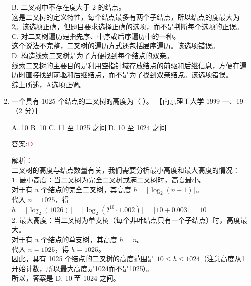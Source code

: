 \documentclass[lang=cn,newtx,10pt,scheme=chinese]{../../../elegantbook}
\begin{document}
\begin{enumerate}
    B. 二叉树中不存在度大于 2 的结点。\\
    这是二叉树的定义特性，每个结点最多有两个子结点，所以结点的度最大为 2。该选项正确，但题目要求选择正确的选项，而不是判断每个选项的正误。\\
    
    C. 对二叉树遍历是指先序、中序或后序遍历中的一种。\\
    这个说法不完整，二叉树的遍历方式还包括层序遍历。该选项错误。\\
    
    D. 构造线索二叉树是为了方便找到每个结点的双亲。\\
    线索二叉树的主要目的是利用空指针域存放结点的前驱和后继信息，方便在遍历时直接找到前驱和后继结点，而不是为了找到双亲结点。该选项错误。\\
    
    综上所述，A选项正确。\\

    \item 一个具有 1025 个结点的二叉树的高度为（ ）。  
    【南京理工大学 1999 一、19（2 分）】  

    A. 10 \quad B. 10 \quad C. 11 至 1025 之间 \quad D. 10 至 1024 之间  

    答案:\textcolor{red}{D}
    
    解析：\\
    二叉树的高度与结点数量有关，我们需要分析最小高度和最大高度的情况：\\
    
    1. 最小高度：当二叉树为完全二叉树或满二叉树时，高度最小。\\
    对于有 $n$ 个结点的完全二叉树，其高度 $h = \lceil \log_2(n+1) \rceil$。\\
    代入 $n = 1025$，得 $h = \lceil \log_2(1026) \rceil = \lceil \log_2(2^{10} \cdot 1.002) \rceil = \lceil 10 + 0.003 \rceil = 10$\\
    
    2. 最大高度：当二叉树为单支树（每个非叶结点只有一个子结点）时，高度最大。\\
    对于有 $n$ 个结点的单支树，其高度 $h = n$。\\
    代入 $n = 1025$，得 $h = 1025$。\\
    
    因此，具有 1025 个结点的二叉树的高度范围是 $10 \leq h \leq 1024$（注意高度从1开始计数，所以最大高度是1024而不是1025）。\\
    
    所以，答案是 D. 10 至 1024 之间。\\


\end{enumerate}
\end{document}
